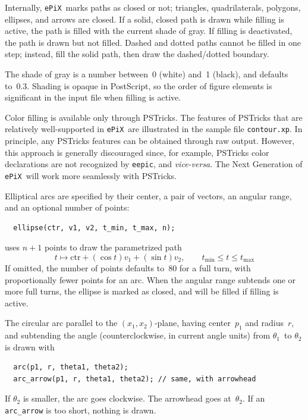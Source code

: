 \documentclass[12pt]{report}
\newcommand{\code}[1]{\texttt{#1}}
\newcommand{\filename}[1]{\texttt{#1}}
\newcommand{\ePiX}{\code{ePiX}}
\newcommand{\eepic}{\code{eepic}}
\begin{document}
Internally, \ePiX\ marks paths as closed or not; triangles,
quadrilaterals, polygons, ellipses, and arrows are closed. If a solid,
closed path is drawn while filling is active, the path is filled with
the current shade of gray. If filling is deactivated, the path is
drawn but not filled. Dashed and dotted paths cannot be filled in one
step; instead, fill the solid path, then draw the dashed/dotted
boundary.

The shade of gray is a number between~0 (white) and~1 (black), and
defaults to~0.3. Shading is opaque in PostScript, so the order of
figure elements is significant in the input file when filling is
active. 

Color filling is available only through PSTricks. The features of
PSTricks that are relatively well-supported in \ePiX\ are illustrated
in the sample file \filename{contour.xp}. In principle, any PSTricks
features can be obtained through raw output. However, this approach is
generally discouraged since, for example, PSTricks color declarations
are not recognized by \eepic, and \emph{vice-versa}. The Next
Generation of \ePiX\ will work more seamlessly with PSTricks.

Elliptical arcs are specified by their center, a pair of vectors, an
angular range, and an optional number of points:
\begin{verbatim}
  ellipse(ctr, v1, v2, t_min, t_max, n);
\end{verbatim}
uses $n+1$ points to draw the parametrized path
\begin{equation*}
  t\mapsto \mathrm{ctr}+(\cos t)v_1 + (\sin t)v_2,\qquad 
  t_\mathrm{min}\leq t\leq t_\mathrm{max}
\end{equation*}
If omitted, the number of points defaults to~80 for a full turn, with
proportionally fewer points for an arc. When the angular range
subtends one or more full turns, the ellipse is marked as closed, and
will be filled if filling is active.

The circular arc parallel to the $(x_1,x_2)$-plane, having center~$p_1$
and radius~$r$, and subtending the angle (counterclockwise, in current
angle units) from $\theta_1$~to $\theta_2$ is drawn with
\begin{verbatim}
  arc(p1, r, theta1, theta2);
  arc_arrow(p1, r, theta1, theta2); // same, with arrowhead
\end{verbatim}
If $\theta_2$ is smaller, the arc goes clockwise. The arrowhead goes
at~$\theta_2$. If an \code{arc\_arrow} is too short, nothing is drawn.
\end{document}
